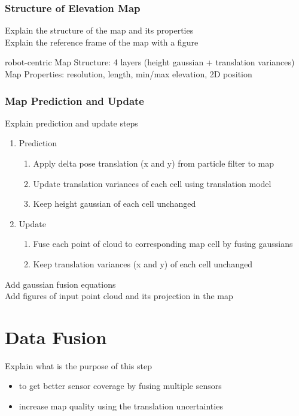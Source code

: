 \subsubsection{Structure of Elevation Map}

Explain the structure of the map and its properties\\
Explain the reference frame of the map with a figure

robot-centric
Map Structure: 4 layers (height gaussian + translation variances)
Map Properties: resolution, length, min/max elevation, 2D position

\subsubsection{Map Prediction and Update}

Explain prediction and update steps

\begin{enumerate}
    \item Prediction
        \begin{enumerate}
            \item Apply delta pose translation (x and y) from particle filter to map
            \item Update translation variances of each cell using translation model
            \item Keep height gaussian of each cell unchanged
        \end{enumerate}
    \item Update
        \begin{enumerate}
            \item Fuse each point of cloud to corresponding map cell by fusing gaussians
            \item Keep translation variances (x and y) of each cell unchanged
        \end{enumerate}
\end{enumerate}

\noindent
Add gaussian fusion equations\\
Add figures of input point cloud and its projection in the map

\section{Data Fusion}

Explain what is the purpose of this step

\begin{itemize}
    \item to get better sensor coverage by fusing multiple sensors
    \item increase map quality using the translation uncertainties
\end{itemize}


